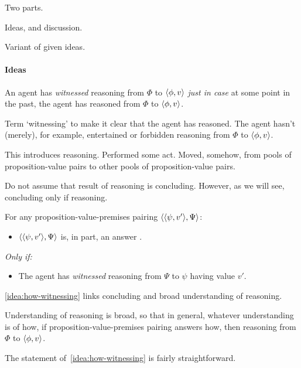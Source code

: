 \begin{note}
  Two parts.

  Ideas, and discussion.

  Variant of \qHow{} given ideas.
\end{note}

\paragraph{Ideas}
\label{sec:clar:expand:qHow:ideas}

\begin{note}
  \begin{definition}[Witnessing]
    An agent has \emph{witnessed} reasoning from \(\Phi\) to \(\langle \phi, v \rangle\) \emph{just in case} at some point in the past, the agent has reasoned from \(\Phi\) to \(\langle \phi, v \rangle\).
  \end{definition}

  Term `witnessing' to make it clear that the agent has reasoned.
  The agent hasn't (merely), for example, entertained or forbidden reasoning from \(\Phi\) to \(\langle \phi, v \rangle\).

  This introduces reasoning.
  Performed some act.
  Moved, somehow, from pools of proposition-value pairs to other pools of proposition-value pairs.

  Do not assume that result of reasoning is concluding.
  However, as we will see, concluding only if reasoning.
\end{note}

\begin{note}
  \begin{idea}[\ideaWitness{}]
    \label{idea:how-witnessing}
    For any proposition-value-premises pairing \(\langle \langle \psi, v' \rangle, \Psi \rangle\):
    \begin{itemize}
    \item
      \(\langle \langle \psi, v' \rangle, \Psi \rangle\) is, in part, an answer \qHow{}.
    \end{itemize}
    \emph{Only if:}
    \begin{itemize}
    \item
      The agent has \emph{witnessed} reasoning from \(\Psi\) to \(\psi\) having value \(v'\).
    \end{itemize}
  \end{idea}

  \autoref{idea:how-witnessing} links concluding and broad understanding of reasoning.

  Understanding of reasoning is broad, so that in general, whatever understanding is of how, if proposition-value-premises pairing answers how, then reasoning from \(\Phi\) to \(\langle \phi, v \rangle\).

  The statement of~\autoref{idea:how-witnessing} is fairly straightforward.
\end{note}

